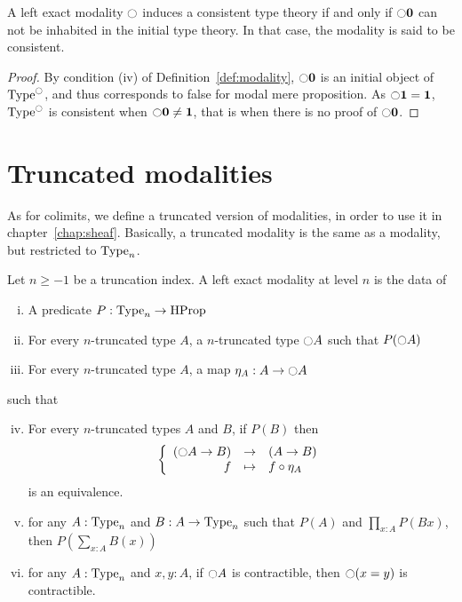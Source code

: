 \begin{prop}\label{prop:consistent}
  A left exact modality $\ocircle$ induces a consistent type theory if
  and only if $\ocircle \mathbf{0}$ can not be inhabited in the initial type
  theory. In that case, the modality is said to be consistent.
\end{prop}
\begin{proof}
  By condition (iv) of Definition~\ref{def:modality},
  $\ocircle \mathbf{0}$ is an initial object of $\operatorname{Type}^{\ocircle}$, and thus
  corresponds to false for modal mere proposition.
  As $\ocircle \mathbf{1} = \mathbf{1}$, $\operatorname{Type}^{\ocircle}$ is consistent when
  $\ocircle \mathbf{0} \neq \mathbf{1}$, that is when there is no proof of
  $\ocircle \mathbf{0}$.
\end{proof}

\section{Truncated modalities}
\label{sec:trunc_modalities}

As for colimits, we define a truncated version of modalities, in order
to use it in chapter~\ref{chap:sheaf}. Basically, a truncated modality
is the same as a modality, but restricted to $\operatorname{Type}_n$. 

\begin{defi}
  \label{def:tr_mod}
  Let $n\geq -1$ be a truncation index. A left exact modality at level
  $n$ is the data of
  \begin{enumerate}[(i)]
  \item A predicate $P:\operatorname{Type}_n \to \operatorname{HProp}$
  \item For every $n$-truncated type $A$, a $n$-truncated type
    $\ocircle A$ such that $P(\ocircle A)$
  \item For every $n$-truncated type $A$, a map $\eta_A:A \to
    \ocircle A$
  \end{enumerate}
  such that
  \begin{enumerate}[(i)]
    \setcounter{enumi}{3}
  \item For every $n$-truncated types $A$ and $B$, if $P(B)$ then
    \[\left\{
      \begin{array}{rcl}
        (\ocircle A \to B) & \to & (A \to B) \\
        f & \mapsto & f \circ \eta_A
      \end{array} \right.\]
    is an equivalence.
  \item for any $A:\operatorname{Type}_n$ and $B:A \to \operatorname{Type}_n$ such that $P(A)$
    and $\prod_{x:A} P(B x)$, then $P\left( \sum_{x:A} B(x)\right)$
  \item for any $A:\operatorname{Type}_n$ and $x,y:A$, if $\ocircle A$ is
    contractible, then $\ocircle (x=y)$ is contractible.
  \end{enumerate}
\end{defi}

